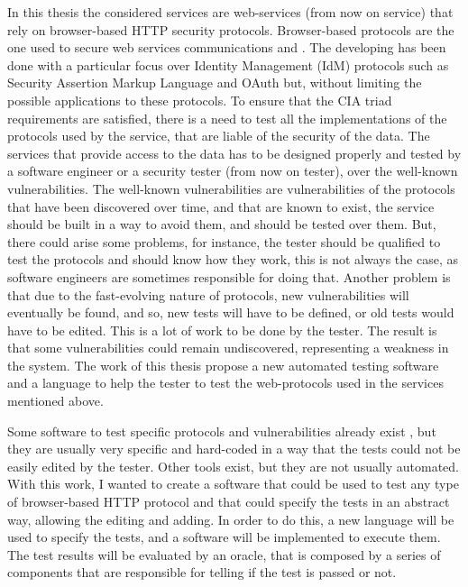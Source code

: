 In this thesis the considered services are web-services (from now on service) that rely on browser-based HTTP security protocols. Browser-based protocols are the one used to secure web services communications and . The developing has been done with a particular focus over Identity Management (IdM) protocols such as Security Assertion Markup Language and \gls{OAuth} but, without limiting the possible applications to these protocols.
To ensure that the CIA triad requirements are satisfied, there is a need to test all the implementations of the protocols used by the service, that are liable of the security of the data. The services that provide access to the data has to be designed properly and tested by a software engineer or a security tester (from now on tester), over the well-known vulnerabilities. The well-known vulnerabilities are vulnerabilities of the protocols that have been discovered over time, and that are known to exist, the service should be built in a way to avoid them, and should be tested over them. But, there could arise some problems, for instance, the tester should be qualified to test the protocols and should know how they work, this is not always the case, as software engineers are sometimes responsible for doing that. Another problem is that due to the fast-evolving nature of protocols, new vulnerabilities will eventually be found, and so, new tests will have to be defined, or old tests would have to be edited. This is a lot of work to be done by the tester. The result is that some vulnerabilities could remain undiscovered, representing a weakness in the system. The work of this thesis propose a new automated testing software and a language to help the tester to test the web-protocols used in the services mentioned above. 

Some software to test specific protocols and vulnerabilities already exist \cite{wendy_barreto,claudio_grisenti}, but they are usually very specific and hard-coded in a way that the tests could not be easily edited by the tester. Other tools exist, but they are not usually automated. With this work, I wanted to create a software that could be used to test any type of browser-based HTTP protocol and that could specify the tests in an abstract way, allowing the editing and adding. In order to do this, a new language will be used to specify the tests, and a software will be implemented to execute them. The test results will be evaluated by an oracle, that is composed by a series of components that are responsible for telling if the test is passed or not.

